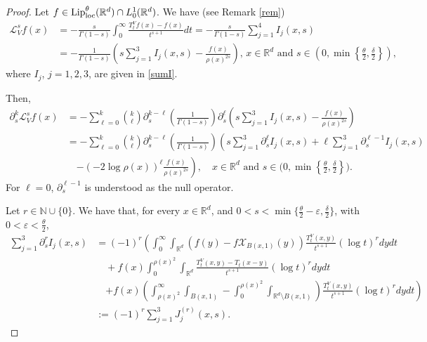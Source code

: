 \documentclass[10pt, a4paper, reqno]{amsart}
\theoremstyle{definition}
\theoremstyle{remark}
\numberwithin{equation}{section}
\begin{document}
\begin{proof}
Let $f\in {\textup{Lip}}_\textup{loc}^\theta (\mathbb R^d)\cap L^1_0(\mathbb R^d)$. We have (see Remark \ref{rem}) 
\begin{align*}
\mathcal L_V^sf(x)&=-\frac{s}{\Gamma (1-s)}\int_0^\infty \frac{T_t^Vf(x)-f(x)}{t^{s+1}}dt=-\frac{s}{\Gamma (1-s)}\sum_{j=1}^4I_j(x,s)\\
&=-\frac{1}{\Gamma (1-s)}\left(s\sum_{j=1}^3I_j(x,s)-\frac{f(x)}{\rho (x)^{2s}}\right),\, x\in \mathbb R^d\mbox{ and }s\in \left(0,\min\left\{\tfrac{\theta}{2},\tfrac{\delta}{2}\right\}\right) ,
\end{align*}
where $I_j$, $j=1,2,3$, are given in \eqref{sumI}.

Then, 
\begin{align}\label{partial LV}
\partial _s^k\mathcal L_V^sf(x)&=-\sum_{\ell =0}^k\binom{k}{\ell }\partial_s^{k-\ell }\left(\frac{1}{\Gamma (1-s)}\right)\partial _s^\ell \left(s\sum_{j=1}^3I_j(x,s)-\frac{f(x)}{\rho (x)^{2s}}\right)\nonumber\\
&=-\sum_{\ell =0}^k\binom{k}{\ell }\partial_s^{k-\ell }\left(\frac{1}{\Gamma (1-s)}\right)\left(s\sum_{j=1}^3\partial _s^\ell I_j(x,s)+\ell \sum_{j=1}^3\partial _s^{\ell -1}I_j(x,s)\right.\nonumber\\
&\quad \left. -(-2\log \rho (x))^\ell \frac{f(x)}{\rho (x)^{2s}}\right),\quad x\in \mathbb R^d\mbox{ and }s\in \big(0,\min\left\{\tfrac{\theta}{2},\tfrac{\delta}{2}\right\}\big).
\end{align}
For $\ell =0$, $\partial _s^{\ell -1}$ is understood as the null operator. 

Let $r\in \mathbb N\cup\{0\}$. We have that, for every $x\in \mathbb R^d$, and $0<s<\min\{\frac{\theta}{2}-\varepsilon, \frac{\delta}{2}\}$, with $0<\varepsilon<\frac{\theta }{2}$, 
\begin{align}\label{sumJ}
\sum_{j=1}^3\partial _s^rI_j(x,s)&=(-1)^r\left(\int_0^\infty \int_{\mathbb R^d}(f(y)-f\mathcal X_{B(x,1)}(y))\frac{T_t^V(x,y)}{t^{s+1}}(\log t)^rdydt\right.\nonumber\\
&\quad +f(x)\int_0^{\rho (x)^2}\int_{\mathbb R^d}\frac{T_t^V(x,y)-T_t(x-y)}{t^{s+1}}(\log t)^rdydt\nonumber\\
&\quad \left.+f(x)\left(\int_{\rho (x)^2}^\infty\int_{B(x,1)}-\int_0^{\rho (x)^2}\int_{\mathbb R^d\setminus B(x,1)} \right)\frac{T_t^V(x,y)}{t^{s+1}}(\log t)^rdydt\right)\nonumber\\
&:=(-1)^r\sum_{j=1}^3J_j^{(r)}(x,s).
\end{align}


\end{proof}
\end{document}
